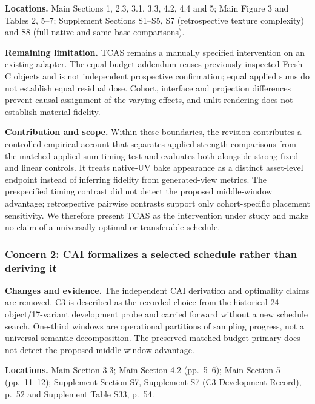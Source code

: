 \documentclass[
  10pt,
]{article}
\begin{document}
\textbf{Locations.} Main Sections 1, 2.3, 3.1, 3.3, 4.2, 4.4 and 5; Main
Figure 3 and Tables 2, 5--7; Supplement Sections S1--S5, S7
(retrospective texture complexity) and S8 (full-native and same-base
comparisons).

\textbf{Remaining limitation.} TCAS remains a manually specified
intervention on an existing adapter. The equal-budget addendum reuses
previously inspected Fresh C objects and is not independent prospective
confirmation; equal applied sums do not establish equal residual dose.
Cohort, interface and projection differences prevent causal assignment
of the varying effects, and unlit rendering does not establish material
fidelity.

\textbf{Contribution and scope.} Within these boundaries, the revision
contributes a controlled empirical account that separates
applied-strength comparisons from the matched-applied-sum timing test
and evaluates both alongside strong fixed and linear controls. It treats
native-UV bake appearance as a distinct asset-level endpoint instead of
inferring fidelity from generated-view metrics. The prespecified timing
contrast did not detect the proposed middle-window advantage;
retrospective pairwise contrasts support only cohort-specific placement
sensitivity. We therefore present TCAS as the intervention under study
and make no claim of a universally optimal or transferable schedule.

\hypertarget{concern-2-cai-formalizes-a-selected-schedule-rather-than-deriving-it}{%
\subsubsection{Concern 2: CAI formalizes a selected schedule rather than
deriving
it}\label{concern-2-cai-formalizes-a-selected-schedule-rather-than-deriving-it}}

\textbf{Changes and evidence.} The independent CAI derivation and
optimality claims are removed. C3 is described as the recorded choice
from the historical 24-object/17-variant development probe and carried
forward without a new schedule search. One-third windows are operational
partitions of sampling progress, not a universal semantic decomposition.
The preserved matched-budget primary does not detect the proposed
middle-window advantage.

\textbf{Locations.} Main Section 3.3; Main Section 4.2 (pp.~5--6); Main
Section 5 (pp.~11--12); Supplement Section S7, Supplement S7 (C3
Development Record), p.~52 and Supplement Table S33, p.~54.
\end{document}
